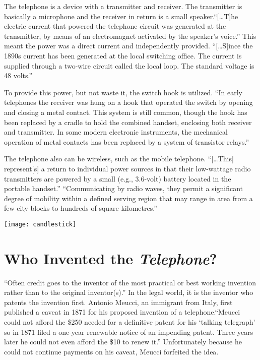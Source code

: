 \documentclass[12pt singlecol]{article}
\newenvironment{Figure}
  {\par\medskip\noindent\minipage{\linewidth}}
  {\endminipage\par\medskip}
\begin{document}
\begin{flushleft}
\begin{multicols}{2}
The telephone is a device with a transmitter and receiver. The transmitter is basically a microphone and the receiver in return is a small speaker.``[\ldots T]he electric current that powered the telephone circuit was generated at the transmitter, by means of an electromagnet activated by the speaker’s voice.''\cite[para.~4]{Encyc13} This meant the power was a direct current and independently provided. ``[\ldots S]ince the 1890s current has been generated at the local switching office. The current is supplied through a two-wire circuit called the local loop. The standard voltage is 48 volts.''\cite[para.~4]{Encyc13} 

To provide this power, but not waste it, the switch hook is utilized. ``In early telephones the receiver was hung on a hook that operated the switch by opening and closing a metal contact. This system is still common, though the hook has been replaced by a cradle to hold the combined handset, enclosing both receiver and transmitter. In some modern electronic instruments, the mechanical operation of metal contacts has been replaced by a system of transistor relays.''\cite[para.~6]{Encyc13}

The telephone also can be wireless, such as the mobile telephone. ``[\ldots This] represent[s] a return to individual power sources in that their low-wattage radio transmitters are powered by a small (e.g., 3.6-volt) battery located in the portable handset.''\cite[para.~5]{Encyc13} ``Communicating by radio waves, they permit a significant degree of mobility within a defined serving region that may range in area from a few city blocks to hundreds of square kilometres.'' \cite[para.~2]{Mobile13}

\begin{Figure}
	\centering
	\texttt{[image: candlestick]}
	\label{fig:candlestick}
\end{Figure}

\section{Who Invented the \emph{Telephone}?}

``Often credit goes to the inventor of the most practical or best working invention rather than to the original inventor(s).'' \cite[para.~1]{LOC12} In the legal world, it is the inventor who patents the invention first. Antonio Meucci, an immigrant from Italy, first published a caveat in 1871 for his proposed invention of a telephone.``Meucci could not afford the \$250 needed for a definitive patent for his `talking telegraph' so in 1871 filed a one-year renewable notice of an impending patent. Three years later he could not even afford the \$10 to renew it.''\cite[para.~10]{Carroll02} Unfortunately because he could not continue payments on his caveat, Meucci forfeited the idea. \cite[para.~3]{LOC12} 


\end{multicols}
\end{flushleft}
\end{document}
